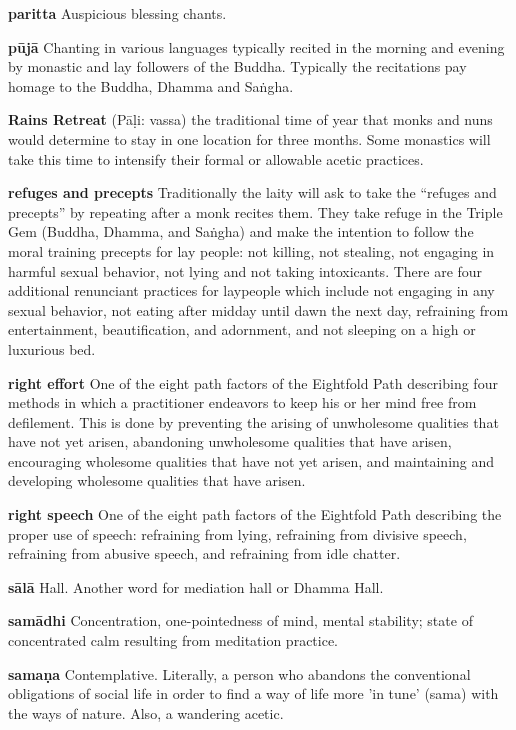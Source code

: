 \textbf{paritta} Auspicious blessing chants.

\textbf{pūjā} Chanting in various languages typically recited in the 
morning and evening by monastic and lay followers of the Buddha. 
Typically the recitations pay homage to the Buddha, Dhamma and Saṅgha.

\textbf{Rains Retreat} (Pāḷi: vassa) the traditional time of year 
that monks and nuns would determine to stay in one location for three 
months. Some monastics will take this time to intensify their formal or 
allowable acetic practices.

\textbf{refuges and precepts} Traditionally the laity will ask to take 
the ``refuges and precepts'' by repeating after a monk recites them. 
They take refuge in the Triple Gem (Buddha, Dhamma, and Saṅgha) and 
make the intention to follow the moral training precepts for lay 
people: not killing, not stealing, not engaging in harmful sexual 
behavior, not lying and not taking intoxicants. There are four 
additional renunciant practices for laypeople which include not 
engaging in any sexual behavior, not eating after midday until dawn the 
next day, refraining from entertainment, beautification, and adornment, 
and not sleeping on a high or luxurious bed.

\textbf{right effort} One of the eight path factors of the Eightfold 
Path describing four methods in which a practitioner endeavors to keep 
his or her mind free from defilement. This is done by preventing the 
arising of unwholesome qualities that have not yet arisen, abandoning 
unwholesome qualities that have arisen, encouraging wholesome qualities 
that have not yet arisen, and maintaining and developing wholesome 
qualities that have arisen.

\textbf{right speech} One of the eight path factors of the Eightfold 
Path describing the proper use of speech: refraining from lying, 
refraining from divisive speech, refraining from abusive speech, and 
refraining from idle chatter.

\textbf{sālā} Hall. Another word for mediation hall or Dhamma Hall.

\textbf{samādhi} Concentration, one-pointedness of mind, mental 
stability; state of concentrated calm resulting from meditation 
practice.

\textbf{samaṇa} Contemplative. Literally, a person who abandons the 
conventional obligations of social life in order to find a way of life 
more 'in tune' (sama) with the ways of nature. Also, a wandering acetic.

